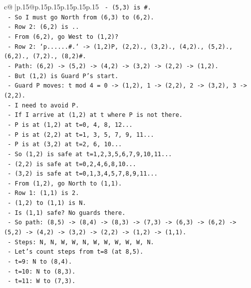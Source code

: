 \documentclass{article}
\begin{document}
{\begin{supertabular}{c@{$\;$}|p{.15\linewidth}@{}p{.15\linewidth}p{.15\linewidth}p{.15\linewidth}p{.15\linewidth}p{.15\linewidth}}
{{{\texttt{    {-} (5,3) is \#.} \\
\texttt{  {-} So I must go North from (6,3) to (6,2).} \\
\texttt{    {-} Row 2: (6,2) is ..} \\
\texttt{    {-} From (6,2), go West to (1,2)?} \\
\texttt{      {-} Row 2: `p......\#.` {-}> (1,2)P, (2,2)., (3,2)., (4,2)., (5,2)., (6,2)., (7,2)., (8,2)\#.} \\
\texttt{      {-} Path: (6,2) {-}> (5,2) {-}> (4,2) {-}> (3,2) {-}> (2,2) {-}> (1,2).} \\
\texttt{      {-} But (1,2) is Guard P's start.} \\
\texttt{      {-} Guard P moves: t mod 4 = 0 {-}> (1,2), 1 {-}> (2,2), 2 {-}> (3,2), 3 {-}> (2,2).} \\
\texttt{      {-} I need to avoid P.} \\
\texttt{      {-} If I arrive at (1,2) at t where P is not there.} \\
\texttt{      {-} P is at (1,2) at t=0, 4, 8, 12...} \\
\texttt{      {-} P is at (2,2) at t=1, 3, 5, 7, 9, 11...} \\
\texttt{      {-} P is at (3,2) at t=2, 6, 10...} \\
\texttt{      {-} So (1,2) is safe at t=1,2,3,5,6,7,9,10,11...} \\
\texttt{      {-} (2,2) is safe at t=0,2,4,6,8,10...} \\
\texttt{      {-} (3,2) is safe at t=0,1,3,4,5,7,8,9,11...} \\
\texttt{  {-} From (1,2), go North to (1,1).} \\
\texttt{    {-} Row 1: (1,1) is 2.} \\
\texttt{    {-} (1,2) to (1,1) is N.} \\
\texttt{    {-} Is (1,1) safe? No guards there.} \\
\texttt{  {-} So path: (8,5) {-}> (8,4) {-}> (8,3) {-}> (7,3) {-}> (6,3) {-}> (6,2) {-}> (5,2) {-}> (4,2) {-}> (3,2) {-}> (2,2) {-}> (1,2) {-}> (1,1).} \\
\texttt{  {-} Steps: N, N, W, W, N, W, W, W, W, W, N.} \\
\texttt{  {-} Let's count steps from t=8 (at 8,5).} \\
\texttt{    {-} t=9: N to (8,4).} \\
\texttt{    {-} t=10: N to (8,3).} \\
\texttt{    {-} t=11: W to (7,3).} \\
}}}
\end{supertabular}}
\end{document}
